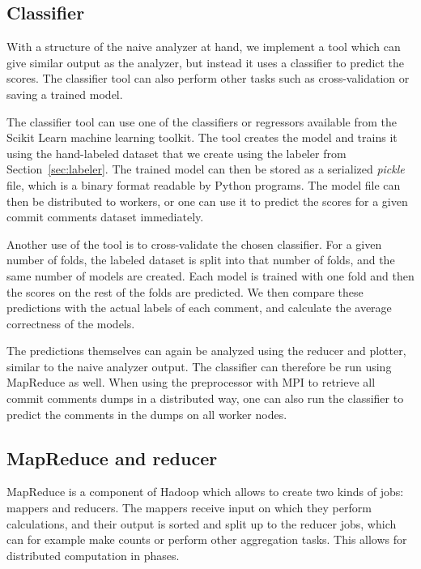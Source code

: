 \documentclass{article}
\begin{document}
\subsection{Classifier}\label{sec:classifier}

With a structure of the naive analyzer at hand, we implement a tool which can 
give similar output as the analyzer, but instead it uses a classifier to
predict the scores. The classifier tool can also perform other tasks such as 
cross-validation or saving a trained model.

The classifier tool can use one of the classifiers or regressors available from 
the Scikit Learn machine learning toolkit. The tool creates the model and 
trains it using the hand-labeled dataset that we create using the labeler from 
Section~\ref{sec:labeler}. The trained model can then be stored as a serialized 
\emph{pickle} file, which is a binary format readable by Python programs. The 
model file can then be distributed to workers, or one can use it to predict the 
scores for a given commit comments dataset immediately.

Another use of the tool is to cross-validate the chosen classifier. For a given 
number of folds, the labeled dataset is split into that number of folds, and 
the same number of models are created. Each model is trained with one fold and 
then the scores on the rest of the folds are predicted. We then compare these 
predictions with the actual labels of each comment, and calculate the average 
correctness of the models.

The predictions themselves can again be analyzed using the reducer and plotter, 
similar to the naive analyzer output. The classifier can therefore be run using 
MapReduce as well. When using the preprocessor with MPI to retrieve all commit 
comments dumps in a distributed way, one can also run the classifier to predict
the comments in the dumps on all worker nodes.

\subsection{MapReduce and reducer}\label{sec:reducer}

MapReduce is a component of Hadoop which allows to create two kinds of jobs: 
mappers and reducers. The mappers receive input on which they perform 
calculations, and their output is sorted and split up to the reducer jobs, 
which can for example make counts or perform other aggregation tasks. This 
allows for distributed computation in phases.
\end{document}
